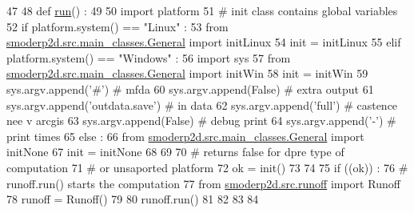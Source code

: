 \begin{DoxyCode}
47 
48 \textcolor{keyword}{def }\hyperlink{namespacesmoderp2d_1_1main_a8b812f157c826c970445b8b37175c026}{run}() :
49   
50   \textcolor{keyword}{import} platform
51   \textcolor{comment}{# init class contains global variables}
52   \textcolor{keywordflow}{if} platform.system() == \textcolor{stringliteral}{"Linux"} :
53     \textcolor{keyword}{from} \hyperlink{namespacesmoderp2d_1_1src_1_1main__classes_1_1General}{smoderp2d.src.main\_classes.General} \textcolor{keyword}{import} initLinux
54     init = initLinux
55   \textcolor{keywordflow}{elif} platform.system() == \textcolor{stringliteral}{"Windows"} :
56     \textcolor{keyword}{import} sys
57     \textcolor{keyword}{from} \hyperlink{namespacesmoderp2d_1_1src_1_1main__classes_1_1General}{smoderp2d.src.main\_classes.General} \textcolor{keyword}{import} initWin
58     init = initWin
59     sys.argv.append(\textcolor{stringliteral}{'#'})               \textcolor{comment}{#  mfda}
60     sys.argv.append(\textcolor{keyword}{False})             \textcolor{comment}{#  extra output}
61     sys.argv.append(\textcolor{stringliteral}{'outdata.save'})    \textcolor{comment}{#  in data}
62     sys.argv.append(\textcolor{stringliteral}{'full'})            \textcolor{comment}{#  castence nee v arcgis}
63     sys.argv.append(\textcolor{keyword}{False})             \textcolor{comment}{#  debug print}
64     sys.argv.append(\textcolor{stringliteral}{'-'})               \textcolor{comment}{# print times}
65   \textcolor{keywordflow}{else} :
66     \textcolor{keyword}{from} \hyperlink{namespacesmoderp2d_1_1src_1_1main__classes_1_1General}{smoderp2d.src.main\_classes.General} \textcolor{keyword}{import} initNone
67     init = initNone
68   
69   
70   \textcolor{comment}{# returns false for dpre type of computation}
71   \textcolor{comment}{# or unsaported platform}
72   ok = init()
73   
74   
75   \textcolor{keywordflow}{if} ((ok)) :
76     \textcolor{comment}{# runoff.run() starts the computation}
77     \textcolor{keyword}{from} \hyperlink{namespacesmoderp2d_1_1src_1_1runoff}{smoderp2d.src.runoff} \textcolor{keyword}{import} Runoff
78     runoff = Runoff()
79     
80     runoff.run()
81 
82 
83 
84 

\end{DoxyCode}
